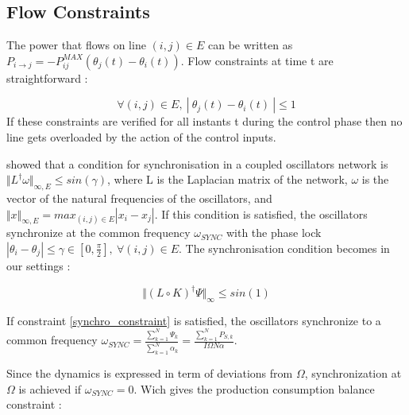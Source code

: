 \documentclass[conference]{IEEEtran}
\begin{document}
\subsection{Flow Constraints}

The power that flows on line $ (i,j) \in E$ can be written as $ P_{i \longrightarrow j} = -P_{ij}^{MAX} \left( \theta_j(t) - \theta_i(t) \right) $. Flow constraints at time t are straightforward :

\begin{equation}
\label{eq:flow_cons}
\forall (i,j) \in E,\ \left|\ \theta_j(t) - \theta_i(t)\ \right| \leq 1
\end{equation}
If these constraints are verified for all instants t during the control phase then no line gets overloaded by the action of the control inputs. 



\cite{Dorfler2013} showed that a condition for synchronisation in a coupled oscillators network is $ \Vert L^{\dagger}\omega \Vert_{\infty,E} \leq sin(\gamma) $, where L is the Laplacian matrix of the network, $ \omega $ is the vector of the natural frequencies of the oscillators, and $ \Vert x \Vert_{\infty,E} = max_{(i,j) \in E} \left| x_i - x_j \right| $. If this condition is satisfied, the oscillators synchronize at the common frequency $ \omega_{SYNC} $ with the phase lock $ \left| \theta_i - \theta_j \right| \leq    \gamma \in[0,\frac{\pi}{2}],\ \forall (i,j) \in E $. The synchronisation condition becomes in our settings :

\begin{equation}
\label{synchro_constraint}
\Vert \left( L \circ K \right)^{\dagger} \Psi \Vert_{\infty} \leq sin(1)
\end{equation}

If constraint \ref{synchro_constraint} is satisfied, the oscillators synchronize to a common frequency $ \omega_{SYNC} = \frac{\sum_{k=1}^{N}\Psi_k}{\sum_{k=1}^{N}\alpha_k} = \frac{\sum_{k=1}^{N}P_{S,k}}{I\Omega N \alpha}$. 

Since the dynamics is expressed in term of deviations from $ \Omega$, synchronization at $ \Omega $ is achieved if $\omega_{SYNC} = 0 $. Wich gives the production consumption balance constraint :
\end{document}
